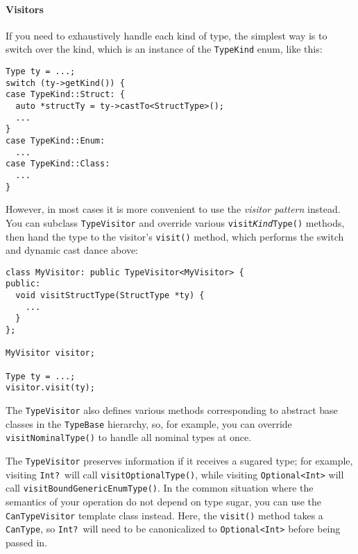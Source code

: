 \documentclass[a4paper,headsepline,bibliography=totoc,toc=flat,fleqn,twoside=semi]{scrbook}
\theoremstyle{definition}
\theoremstyle{definition}
\theoremstyle{definition}
\begin{document}
\paragraph{Visitors}
If you need to exhaustively handle each kind of type, the simplest way is to switch over the kind, which is an instance of the \texttt{TypeKind} enum, like this:
\begin{Verbatim}
Type ty = ...;
switch (ty->getKind()) {
case TypeKind::Struct: {
  auto *structTy = ty->castTo<StructType>();
  ...
}
case TypeKind::Enum:
  ...
case TypeKind::Class:
  ...
}
\end{Verbatim}
However, in most cases it is more convenient to use the \emph{visitor pattern} instead. You can subclass \texttt{TypeVisitor} and override various \texttt{visit\emph{Kind}Type()} methods, then hand the type to the visitor's \texttt{visit()} method, which performs the switch and dynamic cast dance above:
\begin{Verbatim}
class MyVisitor: public TypeVisitor<MyVisitor> {
public:
  void visitStructType(StructType *ty) {
    ...
  }
};

MyVisitor visitor;

Type ty = ...;
visitor.visit(ty);
\end{Verbatim}
The \texttt{TypeVisitor} also defines various methods corresponding to abstract base classes in the \texttt{TypeBase} hierarchy, so, for example, you can override \texttt{visitNominalType()} to handle all nominal types at once.

The \texttt{TypeVisitor} preserves information if it receives a sugared type; for example, visiting \texttt{Int?}\ will call \texttt{visitOptionalType()}, while visiting \texttt{Optional<Int>} will call \texttt{visitBoundGenericEnumType()}. In the common situation where the semantics of your operation do not depend on type sugar, you can use the \texttt{CanTypeVisitor} template class instead. Here, the \texttt{visit()} method takes a \texttt{CanType}, so \texttt{Int?}\ will need to be canonicalized to \texttt{Optional<Int>} before being passed in.
\end{document}
